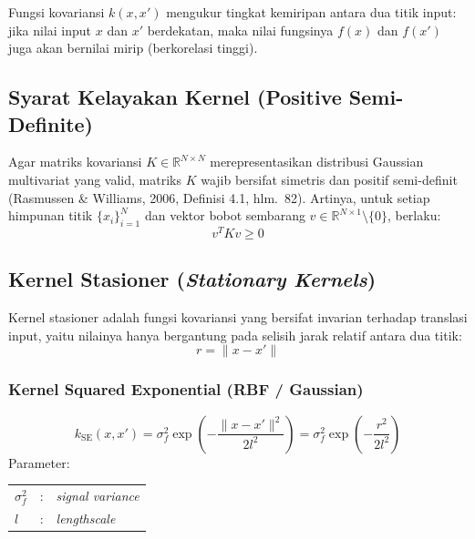\documentclass[11pt,a4paper]{article}
\def\mathbf#1{#1}%
\newcommand{\citep}[2][]{(Rasmussen \& Williams, 2006\if\relax\detokenize{#1}\relax\else, #1\fi)}
\begin{document}
Fungsi kovariansi $k(\mathbf{x}, \mathbf{x}')$ mengukur tingkat kemiripan antara dua titik input: jika nilai input $\mathbf{x}$ dan $\mathbf{x}'$ berdekatan, maka nilai fungsinya $f(\mathbf{x})$ dan $f(\mathbf{x}')$ juga akan bernilai mirip (berkorelasi tinggi).

\subsection{Syarat Kelayakan Kernel (Positive Semi-Definite)}
Agar matriks kovariansi $K \in \mathbb{R}^{N \times N}$ merepresentasikan distribusi Gaussian multivariat yang valid, matriks $K$ wajib bersifat simetris dan positif semi-definit \citep[Definisi 4.1, hlm.~82]{rasmussen2006}. Artinya, untuk setiap himpunan titik $\{ \mathbf{x}_i \}_{i=1}^N$ dan vektor bobot sembarang $\mathbf{v} \in \mathbb{R}^{N \times 1} \setminus \{\mathbf{0}\}$, berlaku:
\begin{equation}
\mathbf{v}^T K \mathbf{v} \ge 0
\end{equation}

\subsection{Kernel Stasioner (\textit{Stationary Kernels})}
Kernel stasioner adalah fungsi kovariansi yang bersifat invarian terhadap translasi input, yaitu nilainya hanya bergantung pada selisih jarak relatif antara dua titik:
\begin{equation}
r = \|\mathbf{x} - \mathbf{x}'\|
\end{equation}

\subsubsection{Kernel Squared Exponential (RBF / Gaussian)}
\begin{equation}
k_{\mathrm{SE}}(\mathbf{x}, \mathbf{x}') = \sigma_f^2 \exp\left( -\frac{\|\mathbf{x} - \mathbf{x}'\|^2}{2 l^2} \right) = \sigma_f^2 \exp\left( -\frac{r^2}{2 l^2} \right)
\end{equation}
Parameter:
\begin{center}
\begin{tabular}{@{} l c l @{}}
$\sigma_f^2$ & : & \textit{signal variance} \\
$l$          & : & \textit{lengthscale}
\end{tabular}
\end{center}
\end{document}
